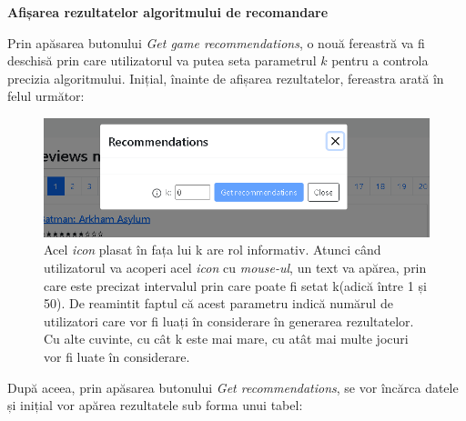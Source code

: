 \documentclass[12pt,a4paper]{report}
\begin{document}
\bigskip
\textbf{Afișarea rezultatelor algoritmului de recomandare}
\bigskip

Prin apăsarea butonului \emph{Get game recommendations}, o nouă fereastră va fi deschisă prin care utilizatorul va putea seta parametrul \( k \) pentru a controla precizia algoritmului. Inițial, înainte de afișarea rezultatelor, fereastra arată în felul următor:

\begin{figure}[H]
\centering
\caption{}
\begin{adjustbox}{max size={\textwidth}{\textheight}}
\includegraphics{exemplu_37_modal_1}
\end{adjustbox}

\caption*{Acel \emph{icon} plasat în fața lui k are rol informativ. Atunci când utilizatorul va acoperi acel \emph{icon} cu \emph{mouse-ul}, un text va apărea, prin care este precizat intervalul prin care poate fi setat k(adică între 1 și 50). De reamintit faptul că acest parametru indică numărul de utilizatori care vor fi luați în considerare în generarea rezultatelor. Cu alte cuvinte, cu cât k este mai mare, cu atât mai multe jocuri vor fi luate în considerare.}
\end{figure}

După aceea, prin apăsarea butonului \emph{Get recommendations}, se vor încărca datele și inițial vor apărea rezultatele sub forma unui tabel:
\end{document}
